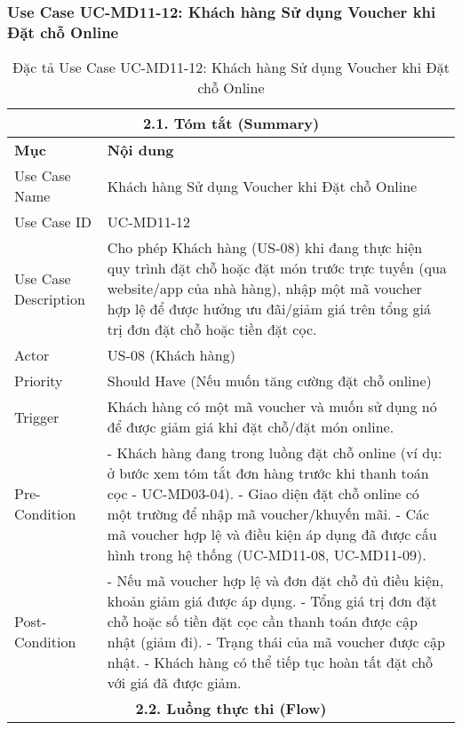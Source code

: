 \subsubsection{Use Case UC-MD11-12: Khách hàng Sử dụng Voucher khi Đặt chỗ Online}
\begin{longtable}{|m{4cm}|p{11cm}|}
\caption{Đặc tả Use Case UC-MD11-12: Khách hàng Sử dụng Voucher khi Đặt chỗ Online} \label{tab:uc_md11_12_customer_uses_voucher_online} \\
\hline
\multicolumn{2}{|c|}{\textbf{2.1. Tóm tắt (Summary)}} \\
\hline
\textbf{Mục} & \textbf{Nội dung} \\
\hline
\endhead
\midrule
\endfoot
\bottomrule
\endlastfoot
Use Case Name & Khách hàng Sử dụng Voucher khi Đặt chỗ Online \\
\hline
Use Case ID & UC-MD11-12 \\
\hline
Use Case Description & Cho phép Khách hàng (US-08) khi đang thực hiện quy trình đặt chỗ hoặc đặt món trước trực tuyến (qua website/app của nhà hàng), nhập một mã voucher hợp lệ để được hưởng ưu đãi/giảm giá trên tổng giá trị đơn đặt chỗ hoặc tiền đặt cọc. \\
\hline
Actor & US-08 (Khách hàng) \\
\hline
Priority & Should Have (Nếu muốn tăng cường đặt chỗ online) \\
\hline
Trigger & Khách hàng có một mã voucher và muốn sử dụng nó để được giảm giá khi đặt chỗ/đặt món online. \\
\hline
Pre-Condition & - Khách hàng đang trong luồng đặt chỗ online (ví dụ: ở bước xem tóm tắt đơn hàng trước khi thanh toán cọc - UC-MD03-04). \newline - Giao diện đặt chỗ online có một trường để nhập mã voucher/khuyến mãi. \newline - Các mã voucher hợp lệ và điều kiện áp dụng đã được cấu hình trong hệ thống (UC-MD11-08, UC-MD11-09). \\
\hline
Post-Condition & - Nếu mã voucher hợp lệ và đơn đặt chỗ đủ điều kiện, khoản giảm giá được áp dụng. \newline - Tổng giá trị đơn đặt chỗ hoặc số tiền đặt cọc cần thanh toán được cập nhật (giảm đi). \newline - Trạng thái của mã voucher được cập nhật. \newline - Khách hàng có thể tiếp tục hoàn tất đặt chỗ với giá đã được giảm. \\
\hline
\multicolumn{2}{|c|}{\textbf{2.2. Luồng thực thi (Flow)}} \\

\end{longtable}
